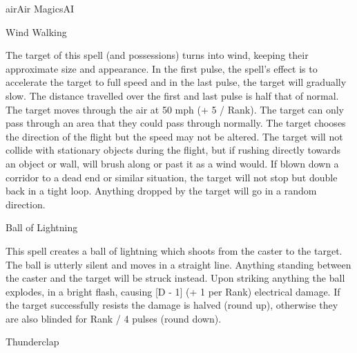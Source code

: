 \begin{college}[2.1]{air}{Air Magics}{AI}
\begin{spell}[S-17]{Wind Walking}
\begin{effects}
The target of this spell (and possessions) turns into wind, keeping
their approximate size and appearance. In the first pulse, the spell's
effect is to accelerate the target to full speed and in the last
pulse, the target will gradually slow.  The distance travelled over
the first and last pulse is half that of normal. The target moves
through the air at 50 mph (+ 5 / Rank). The target can only pass
through an area that they could pass through normally. The target
chooses the direction of the flight but the speed may not be
altered. The target will not collide with stationary objects during
the flight, but if rushing directly towards an object or wall, will
brush along or past it as a wind would. If blown down a corridor to a
dead end or similar situation, the target will not stop but double
back in a tight loop. Anything dropped by the target will go in a
random direction.
\end{effects}
\end{spell}

\begin{spell}[S-18]{Ball of Lightning}

\begin{effects}
This spell creates a ball of lightning which shoots from the caster to
the target. The ball is utterly silent and moves in a straight line.
Anything standing between the caster and the target will be struck
instead.  Upon striking anything the ball explodes, in a bright flash,
causing [D - 1] (+ 1 per Rank) electrical damage. If the target
successfully resists the damage is halved (round up), otherwise they
are also blinded for Rank / 4 pulses (round down).
\end{effects}
\end{spell}

\begin{spell}[S-19]{Thunderclap}


\end{spell}
\end{college}
